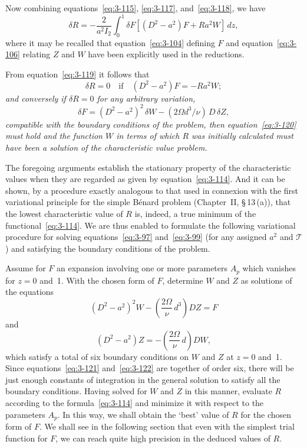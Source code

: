 Now combining equations~\eqref{eq:3-115}, \eqref{eq:3-117}, and~\eqref{eq:3-118}, we have
\begin{equation}\label{eq:3-119}
\delta R = -\frac{2}{a^2 I_2}\int_0^1 \delta F[(D^2 - a^2)F + Ra^2 W]\,dz,
\end{equation}
where it may be recalled that equation~\eqref{eq:3-104} defining $F$ and equation~\eqref{eq:3-106} relating $Z$ and $W$ have been explicitly used in the reductions.

From equation~\eqref{eq:3-119} it follows that
\begin{equation}\label{eq:3-120}
\delta R = 0 \quad \text{if}\quad (D^2 - a^2)F = -Ra^2 W;
\end{equation}
\emph{and conversely if $\delta R = 0$ for any arbitrary variation,}
\[
\delta F = (D^2 - a^2)^2\,\delta W - (2\Omega d^3/\nu)\,D\,\delta Z,
\]
\emph{compatible with the boundary conditions of the problem, then equation~\eqref{eq:3-120} must hold and the function $W$ in terms of which $R$ was initially calculated must have been a solution of the characteristic value problem.}

The foregoing arguments establish the stationary property of the characteristic values when they are regarded as given by equation~\eqref{eq:3-114}. And it can be shown, by a procedure exactly analogous to that used in connexion with the first variational principle for the simple B\'enard problem (Chapter~II, \S\,13\,(a)), that the lowest characteristic value of $R$ is, indeed, a true minimum of the functional~\eqref{eq:3-114}. We are thus enabled to formulate the following variational procedure for solving equations~\eqref{eq:3-97} and~\eqref{eq:3-99} (for any assigned $a^2$ and $\mathscr{T}$) and satisfying the boundary conditions of the problem.

Assume for $F$ an expansion involving one or more parameters $A_p$ which vanishes for $z = 0$ and~1. With the chosen form of $F$, determine $W$ and $Z$ as solutions of the equations
\begin{equation}\label{eq:3-121}
(D^2 - a^2)^2 W - \left(\frac{2\Omega}{\nu}\,d^3\right)\!DZ = F
\end{equation}
and
\begin{equation}\label{eq:3-122}
(D^2 - a^2)Z = -\left(\frac{2\Omega}{\nu}\,d\right)\!DW,
\end{equation}
which satisfy a total of six boundary conditions on $W$ and $Z$ at $z = 0$ and~1. Since equations~\eqref{eq:3-121} and~\eqref{eq:3-122} are together of order six, there will be just enough constants of integration in the general solution to satisfy all the boundary conditions. Having solved for $W$ and $Z$ in this manner, evaluate $R$ according to the formula~\eqref{eq:3-114} and minimize it with respect to the parameters $A_p$. In this way, we shall obtain the `best' value of $R$ for the chosen form of $F$. We shall see in the following section that even with the simplest trial function for $F$, we can reach quite high precision in the deduced values of $R$.

